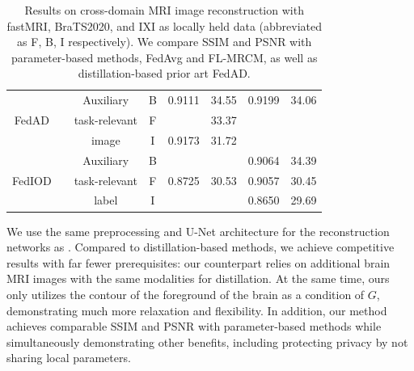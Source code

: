 \documentclass[letterpaper]{article} %
\newcommand{\cmark}{\ding{51}}%
\begin{document}
\begin{table}
{\begin{tabular}{cccc|cc|cc}
\multirow{3}{*}{FedAD}
&\multirow{3}{*}{\cmark} %
&Auxiliary &\cellcolor{gray0}B &\cellcolor{gray0}0.9111 &\cellcolor{gray0}34.55
&\cellcolor{gray0}0.9199 &\cellcolor{gray0}34.06
\\
& &task-relevant  &\cellcolor{gray1}F &\cellcolor{gray1}{0.9182} &\cellcolor{gray1}33.37 &\cellcolor{gray1}{0.9374} &\cellcolor{gray1}{32.76}\\
& &image  &\cellcolor{gray2}I &\cellcolor{gray2}0.9173 &\cellcolor{gray2}31.72  &\cellcolor{gray2}{0.9058} &\cellcolor{gray2}{30.93}\\
\midrule
\multirow{3}{*}{FedIOD}
&\multirow{3}{*}{\cmark}
&Auxiliary &\cellcolor{gray0}B
&\cellcolor{gray0}{0.9326}  &\cellcolor{gray0}{36.08}
&\cellcolor{gray0}0.9064 &\cellcolor{gray0}34.39
\\
& &task-relevant  &\cellcolor{gray1}F &\cellcolor{gray1}0.8725 &\cellcolor{gray1}30.53 &\cellcolor{gray1}0.9057 &\cellcolor{gray1}30.45  \\
& &label  &\cellcolor{gray2}I &\cellcolor{gray2}{0.9198} &\cellcolor{gray2}{32.15} &\cellcolor{gray2}0.8650 &\cellcolor{gray2}29.69 \\
\bottomrule
\end{tabular}}
\caption{Results on cross-domain MRI image reconstruction with fastMRI, BraTS2020, and IXI as locally held data (abbreviated as F, B, I respectively). We compare SSIM and PSNR with parameter-based methods, FedAvg and FL-MRCM,  as well as distillation-based prior art FedAD.
}
\label{tab:mriin}
\end{table}

We use the same preprocessing and U-Net \cite{ronneberger2015u} architecture for the reconstruction networks as \cite{Guo_2021_CVPR, gong2022federated}. %
Compared to distillation-based methods, we achieve competitive results
with far fewer prerequisites: our counterpart \cite{gong2022federated} relies on additional brain MRI images with the same modalities for distillation. At the same time, ours only utilizes the contour of the foreground of the brain as a condition of $G$, demonstrating much more relaxation and flexibility.  In addition, our method achieves comparable SSIM and PSNR with parameter-based methods while simultaneously demonstrating other benefits, including protecting privacy by not sharing local parameters.
\end{document}
